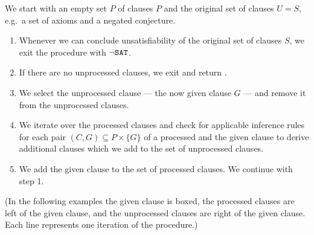 \begin{procedure}\label{proc:given:clause:algorithm}
	We start with an empty set \( P \) of  clauses \( P \)
	and the original set of  clauses \( U = S \),
	e.g.\ a set of axioms and a negated conjecture.
	\begin{enumerate}
		\item[\jek] Whenever we can conclude unsatisfiability of the original set of clauses \( S \),
		we exit the procedure with \( \lnot\texttt{SAT} \).
		\setcounter{enumi}{0}
		\item If there are no unprocessed clauses,
		we exit and return \SAT{}.
		\item We select the  unprocessed clause --- the now given clause \( G  \) --- and remove it from the unprocessed clauses. \hfill\jek{}
		\item We iterate over the processed clauses and check for applicable inference rules
		for each pair \( (C, G) \subseteq P \times \{ G \} \) of a processed and the given clause
		to derive additional clauses which we add to the set of unprocessed clauses. \hfill\jek{}
		\item We add the given clause to the set of processed clauses.
		We continue with step 1.
	\end{enumerate}
\end{procedure}

(In the following examples the given clause is boxed,
the processed clauses are left of the given clause,
and the unprocessed clauses are right of the given clause.
Each line represents one iteration of the procedure.)


